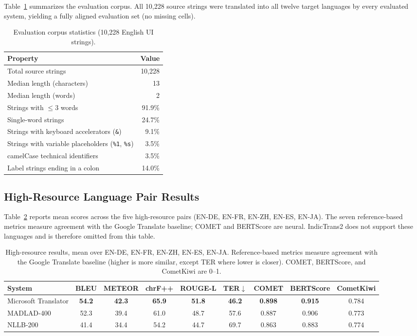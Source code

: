 \documentclass[Afour,sagev,times,doublespace]{sagej}
\begin{document}
Table~\ref{tab:corpusstats} summarizes the evaluation corpus. All 10,228 source strings were translated into all
twelve target languages by every evaluated system, yielding a fully aligned evaluation set (no missing cells).

\begin{table}[t]
\small\sf\centering
\caption{Evaluation corpus statistics (10,228 English UI strings).\label{tab:corpusstats}}
\begin{tabular}{@{}lr@{}}
\toprule
Property & Value \\
\midrule
Total source strings & 10,228 \\
Median length (characters) & 13 \\
Median length (words) & 2 \\
Strings with $\leq$3 words & 91.9\% \\
Single-word strings & 24.7\% \\
Strings with keyboard accelerators (\texttt{\&}) & 9.1\% \\
Strings with variable placeholders (\texttt{\%1}, \texttt{\%s}) & 3.5\% \\
camelCase technical identifiers & 3.5\% \\
Label strings ending in a colon & 14.0\% \\
\bottomrule
\end{tabular}
\end{table}

\subsection{High-Resource Language Pair Results}

Table~\ref{tab:high} reports mean scores across the five high-resource pairs (EN-DE, EN-FR, EN-ZH, EN-ES, EN-JA). The seven reference-based metrics measure agreement with the Google Translate baseline; COMET and BERTScore are neural. IndicTrans2 does not support these languages and is therefore omitted from this table.

\begin{table}[t]
\small\sf\centering
\caption{High-resource results, mean over EN-DE, EN-FR, EN-ZH, EN-ES, EN-JA. Reference-based metrics measure agreement with the Google Translate baseline (higher is more similar, except TER where lower is closer). COMET, BERTScore, and CometKiwi are 0--1.\label{tab:high}}
\begin{tabular}{@{}lcccccccc@{}}
\toprule
System & BLEU & METEOR & chrF++ & ROUGE-L & TER$\downarrow$ & COMET & BERTScore & CometKiwi \\
\midrule
Microsoft Translator & \textbf{54.2} & \textbf{42.3} & \textbf{65.9} & \textbf{51.8} & \textbf{46.2} & \textbf{0.898} & \textbf{0.915} & 0.784 \\
MADLAD-400 & 52.3 & 39.4 & 61.0 & 48.7 & 57.6 & 0.887 & 0.906 & 0.773 \\
NLLB-200 & 41.4 & 34.4 & 54.2 & 44.7 & 69.7 & 0.863 & 0.883 & 0.774 \\
\bottomrule
\end{tabular}
\end{table}
\end{document}
